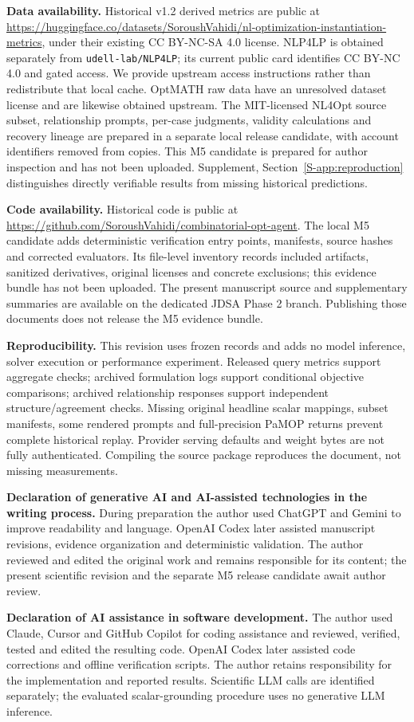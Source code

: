 \documentclass[pdflatex,sn-basic,Numbered]{sn-jnl}
\begin{document}
\noindent\textbf{Data availability.} Historical v1.2 derived metrics are public at \url{https://huggingface.co/datasets/SoroushVahidi/nl-optimization-instantiation-metrics}, under their existing CC BY-NC-SA 4.0 license. NLP4LP is obtained separately from \texttt{udell-lab/NLP4LP}; its current public card identifies CC BY-NC 4.0 and gated access. We provide upstream access instructions rather than redistribute that local cache. OptMATH raw data have an unresolved dataset license and are likewise obtained upstream. The MIT-licensed NL4Opt source subset, relationship prompts, per-case judgments, validity calculations and recovery lineage are prepared in a separate local release candidate, with account identifiers removed from copies. This M5 candidate is prepared for author inspection and has not been uploaded. Supplement, Section~\ref{S-app:reproduction} distinguishes directly verifiable results from missing historical predictions.

\noindent\textbf{Code availability.} Historical code is public at \url{https://github.com/SoroushVahidi/combinatorial-opt-agent}. The local M5 candidate adds deterministic verification entry points, manifests, source hashes and corrected evaluators. Its file-level inventory records included artifacts, sanitized derivatives, original licenses and concrete exclusions; this evidence bundle has not been uploaded. The present manuscript source and supplementary summaries are available on the dedicated JDSA Phase 2 branch. Publishing those documents does not release the M5 evidence bundle.

\noindent\textbf{Reproducibility.} This revision uses frozen records and adds no model inference, solver execution or performance experiment. Released query metrics support aggregate checks; archived formulation logs support conditional objective comparisons; archived relationship responses support independent structure/agreement checks. Missing original headline scalar mappings, subset manifests, some rendered prompts and full-precision PaMOP returns prevent complete historical replay. Provider serving defaults and weight bytes are not fully authenticated. Compiling the source package reproduces the document, not missing measurements.

\noindent\textbf{Declaration of generative AI and AI-assisted technologies in the writing process.} During preparation the author used ChatGPT and Gemini to improve readability and language. OpenAI Codex later assisted manuscript revisions, evidence organization and deterministic validation. The author reviewed and edited the original work and remains responsible for its content; the present scientific revision and the separate M5 release candidate await author review.

\noindent\textbf{Declaration of AI assistance in software development.} The author used Claude, Cursor and GitHub Copilot for coding assistance and reviewed, verified, tested and edited the resulting code. OpenAI Codex later assisted code corrections and offline verification scripts. The author retains responsibility for the implementation and reported results. Scientific LLM calls are identified separately; the evaluated scalar-grounding procedure uses no generative LLM inference.


\end{document}

